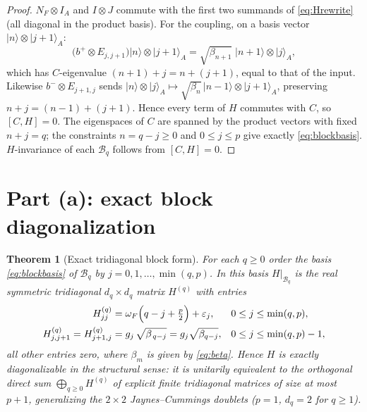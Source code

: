 \documentclass[12pt]{article}
\newtheorem{theorem}{Theorem}
\theoremstyle{definition}
\theoremstyle{remark}
\newcommand{\ket}[1]{\lvert #1\rangle}
\newcommand{\bp}{b^{+}}
\newcommand{\bm}{b^{-}}
\begin{document}
\begin{proof}
$N_F\otimes I_A$ and $I\otimes J$ commute with the first two summands of
\eqref{eq:Hrewrite} (all diagonal in the product basis). For the coupling, on a
basis vector $\ket{n}\otimes\ket{j+1}_A$:
\[
\bigl(\bp\otimes E_{j,j+1}\bigr)\ket n\otimes\ket{j+1}_A
=\sqrt{\beta_{n+1}}\;\ket{n+1}\otimes\ket{j}_A,
\]
which has $C$-eigenvalue $(n+1)+j=n+(j+1)$, equal to that of the input. Likewise
$\bm\otimes E_{j+1,j}$ sends $\ket n\otimes\ket{j}_A\mapsto\sqrt{\beta_n}\,\ket{n-1}\otimes\ket{j+1}_A$,
preserving $n+j=(n-1)+(j+1)$. Hence every term of $H$ commutes with $C$, so
$[C,H]=0$. The eigenspaces of $C$ are spanned by the product vectors with fixed
$n+j=q$; the constraints $n=q-j\ge0$ and $0\le j\le p$ give exactly
\eqref{eq:blockbasis}. $H$-invariance of each $\mathcal B_q$ follows from $[C,H]=0$.
\end{proof}

\section{Part (a): exact block diagonalization}

\begin{theorem}[Exact tridiagonal block form]\label{thm:blocks}
For each $q\ge0$ order the basis \eqref{eq:blockbasis} of $\mathcal B_q$ by
$j=0,1,\dots,\min(q,p)$. In this basis $H|_{\mathcal B_q}$ is the real symmetric
tridiagonal $d_q\times d_q$ matrix $H^{(q)}$ with entries
\begin{align}
H^{(q)}_{jj}&=\omega_F\Bigl(q-j+\tfrac p2\Bigr)+\varepsilon_j,
&& 0\le j\le \min(q,p),\label{eq:diag}\\
H^{(q)}_{j,j+1}=H^{(q)}_{j+1,j}&=g_j\,\sqrt{\beta_{\,q-j}}
=g_j\sqrt{\beta_{q-j}},
&& 0\le j\le \min(q,p)-1,\label{eq:offdiag}
\end{align}
all other entries zero, where $\beta_m$ is given by \eqref{eq:beta}. Hence $H$ is
exactly diagonalizable in the structural sense: it is unitarily equivalent to the
orthogonal direct sum $\bigoplus_{q\ge0} H^{(q)}$ of explicit finite tridiagonal
matrices of size at most $p+1$, generalizing the $2\times2$ Jaynes--Cummings
doublets ($p=1$, $d_q=2$ for $q\ge1$).
\end{theorem}
\end{document}
